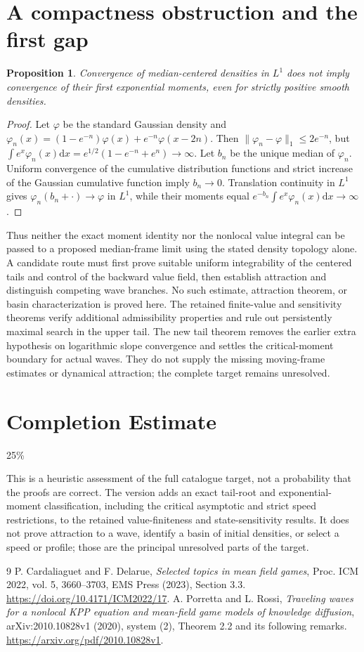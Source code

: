 \documentclass[11pt]{article}
\newtheorem{proposition}[theorem]{Proposition}
\newcommand{\dd}{\mathrm d}
\begin{document}
\section{A compactness obstruction and the first gap}
\begin{proposition}
Convergence of median-centered densities in $L^1$ does not imply convergence of their first exponential moments, even for strictly positive smooth densities.
\end{proposition}
\begin{proof}
Let $\varphi$ be the standard Gaussian density and $\varphi_n(x)=(1-e^{-n})\varphi(x)+e^{-n}\varphi(x-2n)$. Then $\|\varphi_n-\varphi\|_1\le2e^{-n}$, but
$\int e^x\varphi_n(x)\dd x=e^{1/2}(1-e^{-n}+e^n)\to\infty$.
Let $b_n$ be the unique median of $\varphi_n$. Uniform convergence of the cumulative distribution functions and strict increase of the Gaussian cumulative function imply $b_n\to0$. Translation continuity in $L^1$ gives $\varphi_n(b_n+\cdot)\to\varphi$ in $L^1$, while their moments equal $e^{-b_n}\int e^x\varphi_n(x)\dd x\to\infty$.
\end{proof}
Thus neither the exact moment identity nor the nonlocal value integral can be passed to a proposed median-frame limit using the stated density topology alone. A candidate route must first prove suitable uniform integrability of the centered tails and control of the backward value field, then establish attraction and distinguish competing wave branches. No such estimate, attraction theorem, or basin characterization is proved here. The retained finite-value and sensitivity theorems verify additional admissibility properties and rule out persistently maximal search in the upper tail. The new tail theorem removes the earlier extra hypothesis on logarithmic slope convergence and settles the critical-moment boundary for actual waves. They do not supply the missing moving-frame estimates or dynamical attraction; the complete target remains unresolved.

\section{Completion Estimate}
25\%

This is a heuristic assessment of the full catalogue target, not a probability that the proofs are correct. The version adds an exact tail-root and exponential-moment classification, including the critical asymptotic and strict speed restrictions, to the retained value-finiteness and state-sensitivity results. It does not prove attraction to a wave, identify a basin of initial densities, or select a speed or profile; those are the principal unresolved parts of the target.

\begin{thebibliography}{9}
 P. Cardaliaguet and F. Delarue, \emph{Selected topics in mean field games}, Proc. ICM 2022, vol. 5, 3660--3703, EMS Press (2023), Section 3.3. \url{https://doi.org/10.4171/ICM2022/17}.
 A. Porretta and L. Rossi, \emph{Traveling waves for a nonlocal KPP equation and mean-field game models of knowledge diffusion}, arXiv:2010.10828v1 (2020), system (2), Theorem 2.2 and its following remarks. \url{https://arxiv.org/pdf/2010.10828v1}.
\end{thebibliography}
\end{document}

